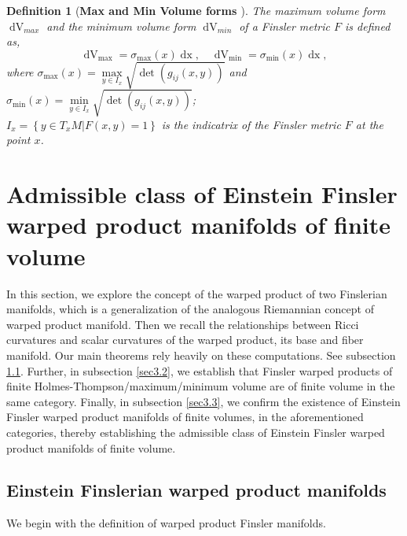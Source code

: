 \documentclass[pdflatex,sn-mathphys-num]{sn-jnl}%
\theoremstyle{thmstyleone}%
\theoremstyle{thmstyletwo}%
\theoremstyle{thmstylethree}%
\newtheorem{definition}{Definition}%
\begin{document}
   \begin{definition}[\textbf{Max and Min Volume forms \cite[\boldmath p. $727$]{BYW}}]
		\textnormal{The {\it maximum} volume form $\operatorname{dV}_{max}$ and the {\it minimum} volume form $\operatorname{dV}_{min}$ of a Finsler metric $F$ is defined as,
			\begin{equation}\label{maxmin}
				\operatorname{dV}_{\max}=\sigma_{\max}(x) \operatorname{dx}, \quad  \operatorname{dV}_{\min}=\sigma_{\min}(x) \operatorname{dx},
			\end{equation}
			where $\sigma_{\max}(x)=\max\limits_{y \in I_x}\sqrt{\det(g_{ij}(x,y))}$ \quad and \quad $\sigma_{\min}(x)=\min\limits_{y\in I_x}\sqrt{\det(g_{ij}(x,y))}$;  \\$I_x=\left\lbrace y\in T_xM| F(x,y)=1\right\rbrace$ is the indicatrix of the Finsler metric $F$ at the point $x$.}
\end{definition}


\vspace{0.15in}

	\section{\textbf{Admissible class of Einstein Finsler warped product manifolds of finite volume}}\label{sec3}
In this section, we explore the concept of the warped product of two Finslerian manifolds, which is a generalization of the analogous Riemannian concept of warped product manifold. Then we 
recall the relationships between  Ricci curvatures and scalar curvatures of the warped product, its base and fiber manifold. Our main theorems rely heavily on these computations. See subsection
\ref{sec3.1}. Further, in subsection \ref{sec3.2}, we establish that 
Finsler warped products of finite Holmes-Thompson/maximum/minimum volume are of finite volume in the same category. Finally, in  subsection 
\ref{sec3.3}, we confirm the existence of Einstein Finsler warped
product manifolds of finite volumes, in the aforementioned categories, thereby establishing the admissible class
of  Einstein  Finsler warped product manifolds of finite volume.
  

  \subsection{ Einstein Finslerian warped product manifolds}\label{sec3.1}

   We begin with the definition of warped product Finsler manifolds.
	
\end{document}
